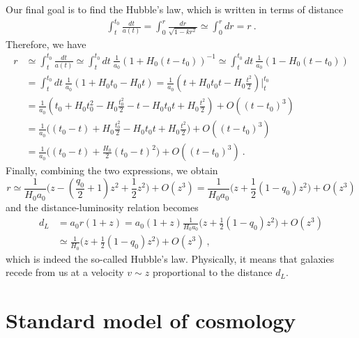     Our final goal is to find the Hubble's law, which is written in terms of distance
    \begin{equation*}
    \begin{aligned}
        \int_{t}^{t_0} \frac{dt}{a(t)} = \int_0^r \frac{dr}{\sqrt{1 - kr^2}} \simeq \int_0^r dr = r ~.
    \end{aligned}
    \end{equation*}
    Therefore, we have
    \begin{equation*}
    \begin{aligned}
        r & \simeq \int_{t}^{t_0} \frac{dt}{a(t)} \simeq \int_{t}^{t_0} dt ~ \frac{1}{a_0} (1 + H_0 (t - t_0))^{-1} \simeq \int_{t}^{t_0} dt ~ \frac{1}{a_0} (1 - H_0 (t - t_0)) \\ & = \int_{t}^{t_0} dt ~ \frac{1}{a_0} (1 + H_0 t_0 - H_0 t) = \frac{1}{a_0} (t + H_0 t_0 t - H_0 \frac{t^2}{2}) \Big \vert_{t}^{t_0} \\ & = \frac{1}{a_0} (t_0 + H_0 t_0^2 - H_0 \frac{t_0^2}{2} - t - H_0 t_0 t + H_0 \frac{t^2}{2} ) + O((t-t_0)^3) \\ & = \frac{1}{a_0} \Big ( (t_0 - t) + H_0 \frac{t_0^2}{2} - H_0 t_0 t + H_0 \frac{t^2}{2}\Big ) + O((t-t_0)^3) \\ & = \frac{1}{a_0} \Big ( (t_0 - t) + \frac{H_0}{2} (t_0 - t)^2 \Big ) + O((t-t_0)^3) ~.
    \end{aligned}
    \end{equation*}
    Finally, combining the two expressions, we obtain 
    \begin{equation*}
        r \simeq \frac{1}{H_0 a_0} \Big (  z - (\frac{q_0}{2} + 1  ) z^2 + \frac{1}{2} z^2 \Big ) + O(z^3) = \frac{1}{H_0 a_0} \Big (  z + \frac{1}{2} (1 - q_0) z^2 \Big ) + O(z^3)
    \end{equation*}
    and the distance-luminosity relation becomes 
    \begin{equation*}
    \begin{aligned}
        d_L & = a_0 r (1+z) = a_0 (1+z) \frac{1}{H_0a_0} \Big (z + \frac{1}{2} (1 - q_0) z^2 \Big ) + O(z^3) \\ & \simeq \frac{1}{H_0} \Big (z + \frac{1}{2} (1 - q_0) z^2 \Big ) + O(z^3) ~,
    \end{aligned}
    \end{equation*}
    which is indeed the so-called Hubble's law. Physically, it means that galaxies recede from us at a velocity $v \sim z$ proportional to the distance $d_L$.

\section{Standard model of cosmology}

